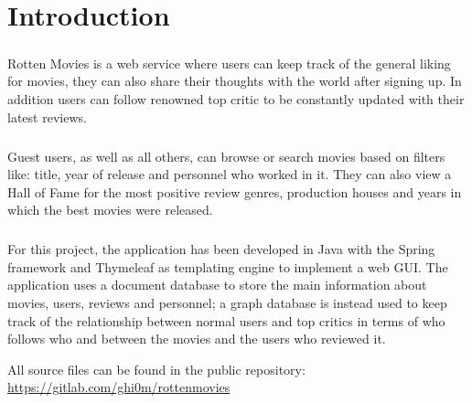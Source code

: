 % 


%

\chapter{Introduction}
\justifying
\paragraph{}
Rotten Movies is a web service where users can keep track of the general liking for movies, they can also share their thoughts with the world after signing up. In addition users can follow renowned top critic to be constantly updated with their latest reviews.
\paragraph{}
Guest users, as well as all others, can browse or search movies based on filters like: title, year of release and personnel who worked in it. They can also view a Hall of Fame for the most positive review genres, production houses and years in which the best movies were released.
\paragraph{}
For this project, the application has been developed in Java with the Spring framework and Thymeleaf as templating engine to implement a web GUI. The application uses a document database to store the main information about movies, users, reviews and personnel; a graph database is instead used to keep track of the relationship between normal users and top critics in terms of who follows who and between the movies and the users who reviewed it.

All source files can be found in the public repository: \url{https://gitlab.com/ghi0m/rottenmovies}

%

